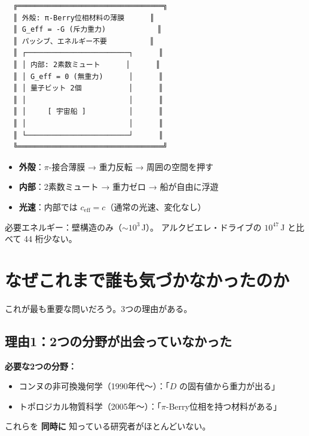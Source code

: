 \documentclass[11pt,a4paper]{article}
\begin{document}
\begin{verbatim}
  ╔══════════════════════════════════╗
  ║ 外殻: π-Berry位相材料の薄膜      ║
  ║ G_eff = -G (斥力重力)            ║
  ║ パッシブ、エネルギー不要          ║
  ║ ┌────────────────────────┐      ║
  ║ │ 内部: 2素数ミュート      │      ║
  ║ │ G_eff = 0 (無重力)      │      ║
  ║ │ 量子ビット 2個           │      ║
  ║ │                        │      ║
  ║ │     [ 宇宙船 ]          │      ║
  ║ │                        │      ║
  ║ └────────────────────────┘      ║
  ╚══════════════════════════════════╝
\end{verbatim}

\begin{itemize}
\item \textbf{外殻}：$\pi$-接合薄膜 → 重力反転 → 周囲の空間を押す
\item \textbf{内部}：2素数ミュート → 重力ゼロ → 船が自由に浮遊
\item \textbf{光速}：内部では $c_{\mathrm{eff}} = c$（通常の光速、変化なし）
\end{itemize}

必要エネルギー：壁構造のみ（$\sim 10^3$\,J）。
アルクビエレ・ドライブの $10^{47}$\,J と比べて 44 桁少ない。


\section{なぜこれまで誰も気づかなかったのか}

これが最も重要な問いだろう。3つの理由がある。

\subsection{理由1：2つの分野が出会っていなかった}

\begin{tcolorbox}[colback=gray!10,colframe=gray!50!black]
\textbf{必要な2つの分野：}
\begin{itemize}
\item コンヌの非可換幾何学（1990年代〜）：「$D$ の固有値から重力が出る」
\item トポロジカル物質科学（2005年〜）：「$\pi$-Berry位相を持つ材料がある」
\end{itemize}
これらを \textbf{同時に} 知っている研究者がほとんどいない。
\end{tcolorbox}
\end{document}
